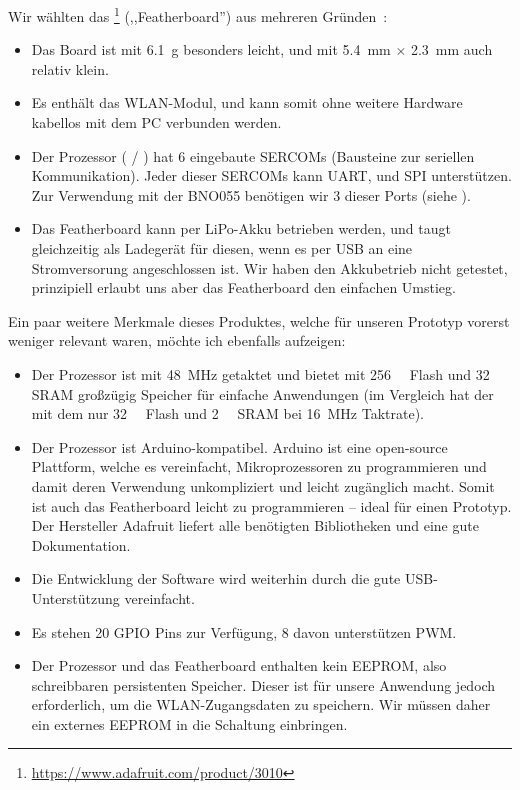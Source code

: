 Wir wählten das \footnote{\url{https://www.adafruit.com/product/3010}} (,,Featherboard'')
aus mehreren Gründen~\cite{featherboard}:

\begin{itemize}
    \item Das Board ist mit \SI{6,1}{g} besonders leicht, und mit
        \SI{5,4}{mm} $\times$ \SI{2,3}{mm} auch relativ klein.
    \item Es enthält das  WLAN-Modul, und kann somit
        ohne weitere Hardware kabellos mit dem PC verbunden werden.
    \item Der Prozessor ( / )
        hat 6 eingebaute SERCOMs (Bausteine zur seriellen Kommunikation).
        Jeder dieser SERCOMs kann UART, \iic und SPI unterstützen.  Zur
        Verwendung mit der BNO055 benötigen wir 3 dieser Ports (siehe
        ).
    \item Das Featherboard kann per LiPo-Akku betrieben werden, und taugt
        gleichzeitig als Ladegerät für diesen, wenn es per USB an eine
        Stromversorung angeschlossen ist. Wir haben den Akkubetrieb nicht
        getestet, prinzipiell erlaubt uns aber das Featherboard den einfachen
        Umstieg.
\end{itemize}

Ein paar weitere Merkmale dieses Produktes, welche für unseren Prototyp
vorerst weniger relevant waren, möchte ich ebenfalls aufzeigen:

\begin{itemize}
    \item Der Prozessor ist mit \SI{48}{\mega\hertz} getaktet und bietet mit
        \SI{256}{\kilo\byte} Flash und \SI{32}{\kilo\byte} SRAM großzügig
        Speicher für einfache Anwendungen (im Vergleich hat der
         mit dem  nur
        \SI{32}{\kilo\byte} Flash und \SI{2}{\kilo\byte} SRAM bei
        \SI{16}{\mega\hertz} Taktrate).
    \item Der Prozessor ist Arduino-kompatibel. Arduino ist eine open-source
        Plattform, welche es vereinfacht, Mikroprozessoren zu programmieren und
        damit deren Verwendung unkompliziert und leicht zugänglich macht.
        Somit ist auch das Featherboard leicht zu programmieren -- ideal für
        einen Prototyp. Der Hersteller Adafruit liefert alle benötigten
        Bibliotheken und eine gute Dokumentation.
    \item Die Entwicklung der Software wird weiterhin durch die gute
        USB-Unterstützung vereinfacht.
    \item Es stehen 20 GPIO Pins zur Verfügung, 8 davon unterstützen PWM.
    \item Der Prozessor und das Featherboard enthalten kein EEPROM, also
        schreibbaren persistenten Speicher. Dieser ist für unsere Anwendung
        jedoch erforderlich, um die WLAN-Zugangsdaten zu speichern. Wir
        müssen daher ein externes EEPROM in die Schaltung einbringen.
\end{itemize}

